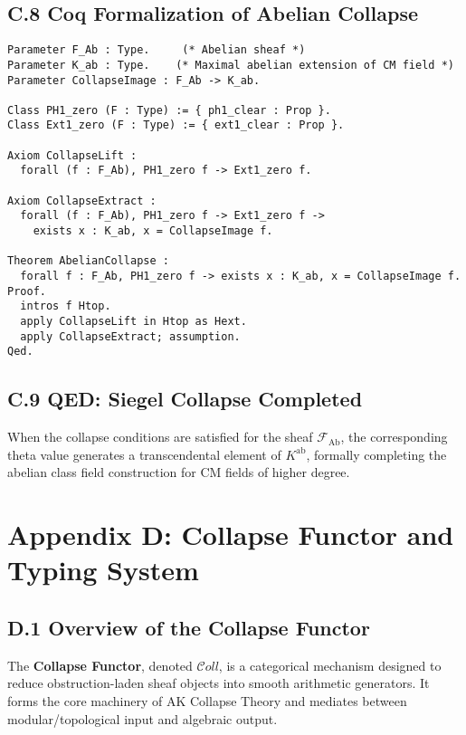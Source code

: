 \documentclass[11pt]{article}
\begin{document}
\subsection*{C.8 Coq Formalization of Abelian Collapse}
\label{sec:coq-collapse-abelian}

\begin{lstlisting}[language=Coq, caption={Coq Encoding: Siegel Collapse}]
Parameter F_Ab : Type.     (* Abelian sheaf *)
Parameter K_ab : Type.    (* Maximal abelian extension of CM field *)
Parameter CollapseImage : F_Ab -> K_ab.

Class PH1_zero (F : Type) := { ph1_clear : Prop }.
Class Ext1_zero (F : Type) := { ext1_clear : Prop }.

Axiom CollapseLift :
  forall (f : F_Ab), PH1_zero f -> Ext1_zero f.

Axiom CollapseExtract :
  forall (f : F_Ab), PH1_zero f -> Ext1_zero f ->
    exists x : K_ab, x = CollapseImage f.

Theorem AbelianCollapse :
  forall f : F_Ab, PH1_zero f -> exists x : K_ab, x = CollapseImage f.
Proof.
  intros f Htop.
  apply CollapseLift in Htop as Hext.
  apply CollapseExtract; assumption.
Qed.
\end{lstlisting}

\subsection*{C.9 QED: Siegel Collapse Completed}

When the collapse conditions are satisfied for the sheaf \( \mathcal{F}_{\mathrm{Ab}} \), the corresponding theta value generates a transcendental element of \( K^{\mathrm{ab}} \), formally completing the abelian class field construction for CM fields of higher degree.



\section*{Appendix D: Collapse Functor and Typing System}

\subsection*{D.1 Overview of the Collapse Functor}

The \textbf{Collapse Functor}, denoted \( \mathcal{C}oll \), is a categorical mechanism designed to reduce obstruction-laden sheaf objects into smooth arithmetic generators.  
It forms the core machinery of AK Collapse Theory and mediates between modular/topological input and algebraic output.
\end{document}
